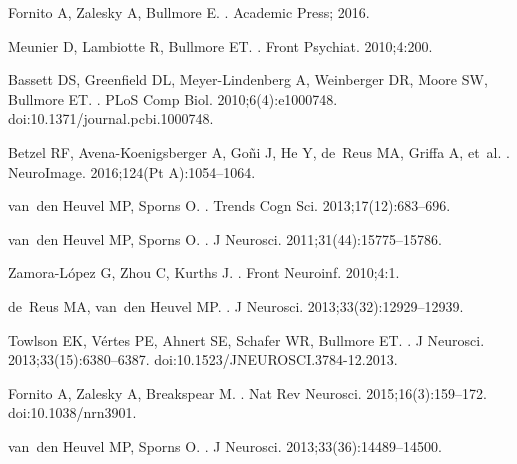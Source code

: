 \documentclass[10pt,letterpaper]{article}
\begin{document}
{\begin{thebibliography}{100}
Fornito A, Zalesky A, Bullmore E.
.
\newblock Academic Press; 2016.

Meunier D, Lambiotte R, Bullmore ET.
.
\newblock Front Psychiat. 2010;4:200.

Bassett DS, Greenfield DL, Meyer-Lindenberg A, Weinberger DR, Moore SW,
  Bullmore ET.
.
\newblock PLoS Comp Biol. 2010;6(4):e1000748.
\newblock doi:{10.1371/journal.pcbi.1000748}.

Betzel RF, Avena-Koenigsberger A, Go{\~n}i J, He Y, de~Reus MA, Griffa A,
  et~al.
.
\newblock NeuroImage. 2016;124(Pt A):1054--1064.

van~den Heuvel MP, Sporns O.
.
\newblock Trends Cogn Sci. 2013;17(12):683--696.

van~den Heuvel MP, Sporns O.
.
\newblock J Neurosci. 2011;31(44):15775--15786.

Zamora-L{\'o}pez G, Zhou C, Kurths J.
.
\newblock Front Neuroinf. 2010;4:1.

de~Reus MA, van~den Heuvel MP.
.
\newblock J Neurosci. 2013;33(32):12929--12939.

Towlson EK, V{\'{e}}rtes PE, Ahnert SE, Schafer WR, Bullmore ET.
.
\newblock J Neurosci. 2013;33(15):6380--6387.
\newblock doi:{10.1523/JNEUROSCI.3784-12.2013}.

Fornito A, Zalesky A, Breakspear M.
.
\newblock Nat Rev Neurosci. 2015;16(3):159--172.
\newblock doi:{10.1038/nrn3901}.

van~den Heuvel MP, Sporns O.
.
\newblock J Neurosci. 2013;33(36):14489--14500.


\end{thebibliography}}
\end{document}
